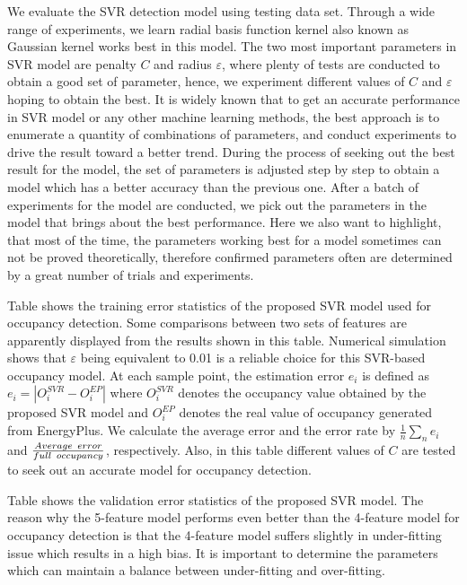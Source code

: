 We evaluate the SVR detection model using
testing data set. Through a wide range of experiments, we learn radial
basis function kernel also known as Gaussian kernel works best in this
model. The two most important parameters in SVR model are penalty $C$
and radius $\varepsilon$, where plenty of tests are conducted to obtain
a good set of parameter, hence, we experiment different values of $C$
and $\varepsilon$ hoping to obtain the best. It is widely known that
to get an accurate performance in SVR model or any other machine
learning methods, the best approach is to enumerate a quantity of
combinations of parameters, and conduct experiments to drive the
result toward a better trend. During the process of seeking out the
best result for the model, the set of parameters is adjusted step by
step to obtain a model which has a better accuracy than the previous
one. After a batch of experiments for the model are conducted, we pick
out the parameters in the model that brings about the best
performance. Here we also want to highlight, that most of the time,
the parameters working best for a model sometimes can not be proved
theoretically, therefore confirmed parameters often are determined by
a great number of trials and experiments.

Table  shows the training error statistics of the proposed SVR
model used for occupancy detection. Some comparisons between two sets
of features are apparently displayed from the results shown in this
table. Numerical simulation shows that $\varepsilon$ being equivalent
to 0.01 is a reliable choice for this SVR-based occupancy model. At
each sample point, the estimation error ${e_i}$ is defined as
${e_i} = \left| {O_i^{SVR} - O_i^{EP}} \right|$ where $O_i^{SVR}$
denotes the occupancy value obtained by the proposed SVR model and
$O_i^{EP}$ denotes the real value of occupancy generated from EnergyPlus. We calculate the average error and the error rate by
$\frac{1}{n}\sum\nolimits_n {{e_i}}$ and
$\frac{{Average{\kern 1pt} {\kern 1pt} {\kern 1pt} {\kern 1pt}
    error}}{{full{\kern 1pt} {\kern 1pt} {\kern 1pt} {\kern 1pt}
    occupancy}}$,
respectively. Also, in this table different values of $C$ are tested
to seek out an accurate model for occupancy detection.

Table  shows the validation error statistics of the proposed SVR model. The reason why the 5-feature model performs even better than the 4-feature model for occupancy detection is that the 4-feature model suffers slightly in under-fitting issue which results in a high bias. It is important to determine the parameters which can maintain a balance between under-fitting and over-fitting.


